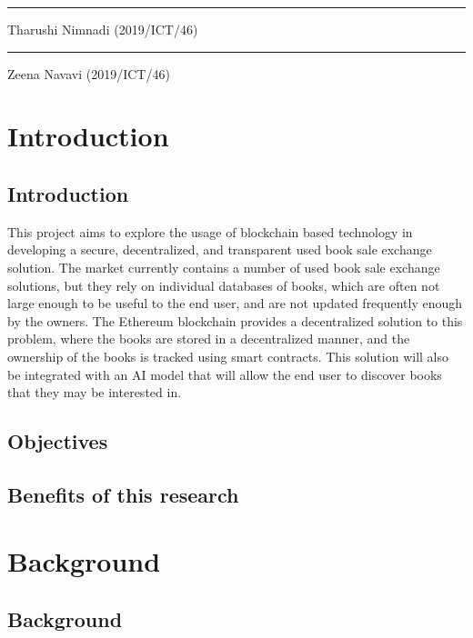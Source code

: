 \documentclass{article}
\begin{document}
\vspace{2cm} %
\rule{5cm}{0.5pt} %
\linebreak
Tharushi Nimnadi (2019/ICT/46)

\vspace{2cm} %
\rule{5cm}{0.5pt} %
\linebreak
Zeena Navavi (2019/ICT/46)

\newpage

\tableofcontents
\newpage

\section{Introduction}
\subsection{Introduction}
This project aims to explore the usage of blockchain based technology in developing
a secure, decentralized, and transparent used book sale exchange solution. The market
currently contains a number of used book sale exchange solutions, but they rely on
individual databases of books, which are often not large enough to be useful to the
end user, and are not updated frequently enough by the owners. The Ethereum blockchain
provides a decentralized solution to this problem, where the books are stored in a
decentralized manner, and the ownership of the books is tracked using smart contracts.
This solution will also be integrated with an AI model that will allow the end user to
discover books that they may be interested in.

\subsection{Objectives}


\subsection{Benefits of this research}


\section{Background}
\subsection{Background}
\end{document}
